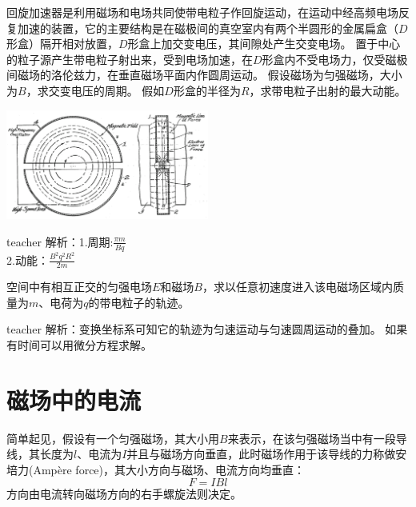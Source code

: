\newpage
\begin{example}
回旋加速器是利用磁场和电场共同使带电粒子作回旋运动，在运动中经高频电场反复加速的装置，它的主要结构是在磁极间的真空室内有两个半圆形的金属扁盒（$D$形盒）隔开相对放置，$D$形盒上加交变电压，其间隙处产生交变电场。
置于中心的粒子源产生带电粒子射出来，受到电场加速，在$D$形盒内不受电场力，仅受磁极间磁场的洛伦兹力，在垂直磁场平面内作圆周运动。
假设磁场为匀强磁场，大小为$B$，求交变电压的周期。
假如$D$形盒的半径为$R$，求带电粒子出射的最大动能。
\begin{flushright}
\includegraphics[width = 0.5\textwidth]{images/mag-38.pdf} 
\end{flushright}
\begin{taggedblock}{teacher}
\noindent
解析：1.周期:$\frac{\pi m}{Bq}$
\\2.动能：$\frac{B^2q^2R^2}{2m}$
\end{taggedblock}
\end{example}



\begin{example}
空间中有相互正交的匀强电场$E$和磁场$B$，求以任意初速度进入该电磁场区域内质量为$m$、电荷为$q$的带电粒子的轨迹。
\begin{taggedblock}{teacher}
\newline
解析：变换坐标系可知它的轨迹为匀速运动与匀速圆周运动的叠加。
如果有时间可以用微分方程求解。
\end{taggedblock}
\end{example}




\section{磁场中的电流}

简单起见，假设有一个匀强磁场，其大小用$B$来表示，在该匀强磁场当中有一段导线，其长度为$l$、电流为$I$并且与磁场方向垂直，此时磁场作用于该导线的力称做{\heiti 安培力}(Amp\`ere force)，其大小方向与磁场、电流方向均垂直：
\begin{equation}
F=IBl
\end{equation}
方向由电流转向磁场方向的右手螺旋法则决定。

